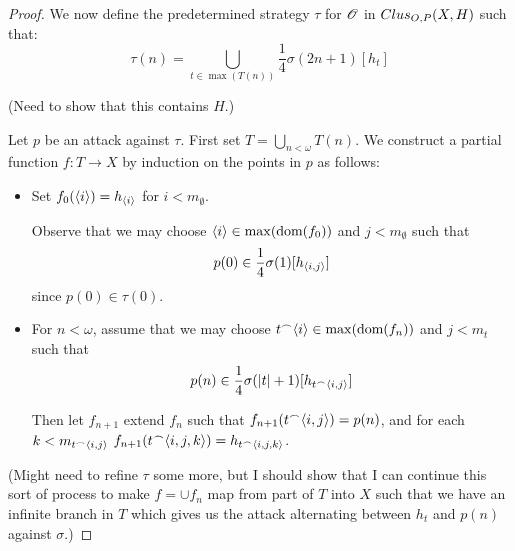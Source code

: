 \begin{proof}
  \bigskip

  We now define the predetermined strategy $\tau$ for $\mathscr{O}$ in 
  $Clus_{O,P}(X,H)$ such that:
  \[
    \tau(n) 
      = 
    \bigcup_{t\in\max(T(n))} \frac{1}{4}\sigma(2n+1)[h_t]
  \]

  (Need to show that this contains $H$.)

  Let $p$ be an attack against $\tau$. First set $T=\bigcup_{n<\omega} T(n)$.
  We construct a partial function $f:T\to X$ by induction
  on the points in $p$ as follows: 

  \begin{itemize}
    \item Set $f_0(\langle i\rangle)=h_{\langle i\rangle}$ for $i<m_\emptyset$.

      Observe that we may choose $\langle i\rangle\in\max(\textrm{dom}(f_0))$ and $j<m_\emptyset$
      such that
      \[
        p(0)
          \in
        \frac{1}{4}\sigma(1)[h_{\langle i,j\rangle}]
      \]
      since $p(0)\in\tau(0)$.
    \item For $n<\omega$, assume that we may choose 
      $t^\frown\langle i\rangle\in \max(\textrm{dom}(f_n))$ and $j<m_t$ such that 
      \[
        p(n)
          \in
        \frac{1}{4}\sigma(|t|+1)[h_{t^\frown\langle i,j\rangle}]
      \] 
      
      Then let $f_{n+1}$ extend $f_n$ such that 
      $f_{n+1}(t^\frown\langle i,j\rangle)=p(n)$, and for each $k<m_{t^\frown\langle i,j\rangle}$ 
      $f_{n+1}(t^\frown\langle i,j,k\rangle)=h_{t^\frown\langle i,j,k\rangle}$.
  \end{itemize}

  (Might need to refine $\tau$ some more, but I should show that I can 
  continue this sort of process to make $f=\cup f_n$ map from part of $T$
  into $X$ such that we have an infinite branch in $T$ which gives us the 
  attack alternating between $h_t$ and $p(n)$ against $\sigma$.)
\end{proof}






